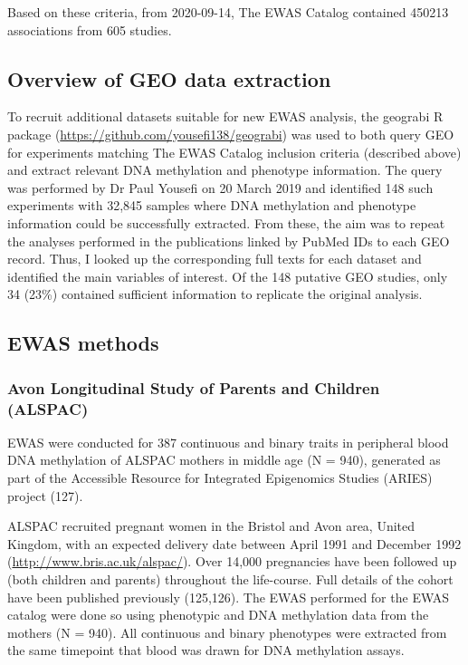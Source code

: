 \documentclass[11pt,oneside]{bristolthesis}
\begin{document}
Based on these criteria, from 2020-09-14, The EWAS Catalog contained 450213 associations from 605 studies.

\hypertarget{overview-of-geo-data-extraction}{%
\subsection{Overview of GEO data extraction}\label{overview-of-geo-data-extraction}}

To recruit additional datasets suitable for new EWAS analysis, the geograbi R package (\url{https://github.com/yousefi138/geograbi}) was used to both query GEO for experiments matching The EWAS Catalog inclusion criteria (described above) and extract relevant DNA methylation and phenotype information. The query was performed by Dr Paul Yousefi on 20 March 2019 and identified 148 such experiments with 32,845 samples where DNA methylation and phenotype information could be successfully extracted. From these, the aim was to repeat the analyses performed in the publications linked by PubMed IDs to each GEO record. Thus, I looked up the corresponding full texts for each dataset and identified the main variables of interest. Of the 148 putative GEO studies, only 34 (23\%) contained sufficient information to replicate the original analysis.

\hypertarget{ewas-methods-03}{%
\subsection{EWAS methods}\label{ewas-methods-03}}

\hypertarget{alspac-03}{%
\subsubsection{Avon Longitudinal Study of Parents and Children (ALSPAC)}\label{alspac-03}}

EWAS were conducted for 387 continuous and binary traits in peripheral blood DNA methylation of ALSPAC mothers in middle age (N = 940), generated as part of the Accessible Resource for Integrated Epigenomics Studies (ARIES) project (127).

ALSPAC recruited pregnant women in the Bristol and Avon area, United Kingdom, with an expected delivery date between April 1991 and December 1992 (\url{http://www.bris.ac.uk/alspac/}). Over 14,000 pregnancies have been followed up (both children and parents) throughout the life-course. Full details of the cohort have been published previously (125,126). The EWAS performed for the EWAS catalog were done so using phenotypic and DNA methylation data from the mothers (N = 940).
All continuous and binary phenotypes were extracted from the same timepoint that blood was drawn for DNA methylation assays.
\end{document}
